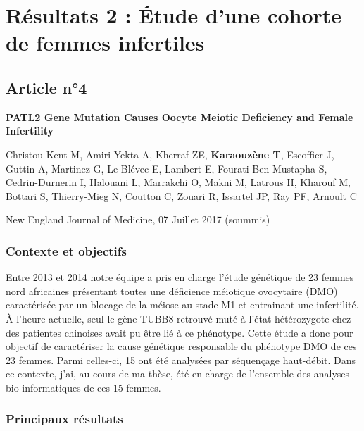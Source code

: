 \documentclass[12pt,a4paper,twoside]{ugathesis}
\begin{document}
\newpage

\section{Résultats 2 : Étude d'une cohorte de femmes
infertiles}\label{resultats-2-etude-dune-cohorte-de-femmes-infertiles}

\subsection{Article n°4}\label{article-n4}

\textbf{PATL2 Gene Mutation Causes Oocyte Meiotic Deficiency and Female
Infertility}

Christou-Kent M, Amiri-Yekta A, Kherraf ZE, \textbf{Karaouzène T},
Escoffier J, Guttin A, Martinez G, Le Blévec E, Lambert E, Fourati Ben
Mustapha S, Cedrin-Durnerin I, Halouani L, Marrakchi O, Makni M, Latrous
H, Kharouf M, Bottari S, Thierry-Mieg N, Coutton C, Zouari R, Issartel
JP, Ray PF, Arnoult C

New England Journal of Medicine, 07 Juillet 2017 (soummis)

\newpage

\subsubsection{Contexte et objectifs}\label{contexte-et-objectifs-3}

Entre 2013 et 2014 notre équipe a pris en charge l'étude génétique de 23
femmes nord africaines présentant toutes une déficience méiotique
ovocytaire (DMO) caractérisée par un blocage de la méiose au stade M1 et
entrainant une infertilité. À l'heure actuelle, seul le gène TUBB8
retrouvé muté à l'état hétérozygote chez des patientes chinoises avait
pu être lié à ce phénotype. Cette étude a donc pour objectif de
caractériser la cause génétique responsable du phénotype DMO de ces 23
femmes. Parmi celles-ci, 15 ont été analysées par séquençage haut-débit.
Dans ce contexte, j'ai, au cours de ma thèse, été en charge de
l'ensemble des analyses bio-informatiques de ces 15 femmes.

\newpage



\newpage

\subsubsection{Principaux résultats}\label{principaux-resultats-3}
\end{document}
